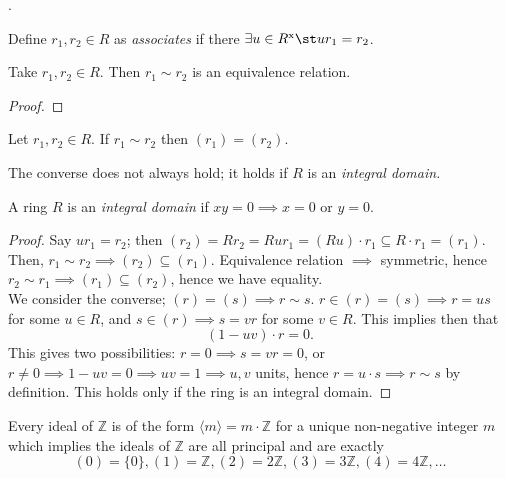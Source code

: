 \documentclass[12pt,oneside]{article}
\begin{document}
.

\begin{definition}[Associates]
  Define $r_1, r_2 \in R$ as \emph{associates} if there $\exists u \in R^{\text{x}} \st u r_1 = r_2$.\footnotemark
\end{definition}


\begin{proposition}
  Take $r_1, r_2 \in R$. Then $r_1 \sim r_2$ is an equivalence relation.
\end{proposition}

\begin{proof}
\end{proof}

\begin{lemma}\label{lemma:relatedasssociates}
  Let $r_1, r_2 \in R$. If $r_1 \sim r_2$ then $(r_1) = (r_2)$.
\end{lemma}

\begin{remark}
  The converse does not always hold; it holds if $R$ is an \emph{integral domain.}
\end{remark}

\begin{definition}
  A ring $R$ is an \emph{integral domain} if $xy = 0 \implies x = 0 \text{ or } y = 0$.
\end{definition}

\begin{proof}
  Say $u r_1 = r_2$; then $(r_2) = R r_2 = R u r_1 = (Ru)\cdot r_1 \subseteq R \cdot r_1 = (r_1)$. Then, $r_1 \sim r_2 \implies (r_2) \subseteq (r_1)$. Equivalence relation $\implies$ symmetric, hence $r_2 \sim r_1 \implies (r_1) \subseteq (r_2)$, hence we have equality.\\
  We consider the converse; $(r) = (s) \implies r \sim s$. $r \in (r) = (s) \implies r = us$ for some $u \in R$, and $s\in (r) \implies s = vr$ for some $v \in R$. This implies then that \[(1-uv) \cdot r = 0.\]
  This gives two possibilities: $r = 0 \implies s = vr = 0$, or $r\neq 0 \implies 1 - uv = 0 \implies uv = 1 \implies u,v$ units, hence $r = u\cdot s  \implies r \sim s$ by definition. This holds only if the ring is an integral domain.
\end{proof}
\begin{theorem}
  Every ideal of $\mathbb{Z}$ is of the form $\langle m \rangle = m \cdot \mathbb{Z}$ for a unique non-negative integer $m$ which implies the ideals of $\mathbb{Z}$ are all principal and are exactly
  \[
  (0) = \{0\}, (1) = \mathbb{Z} , (2) = 2 \mathbb{Z}, (3) = 3 \mathbb{Z}, (4) = 4 \mathbb{Z}, \dots
  \]
\end{theorem}
\end{document}
